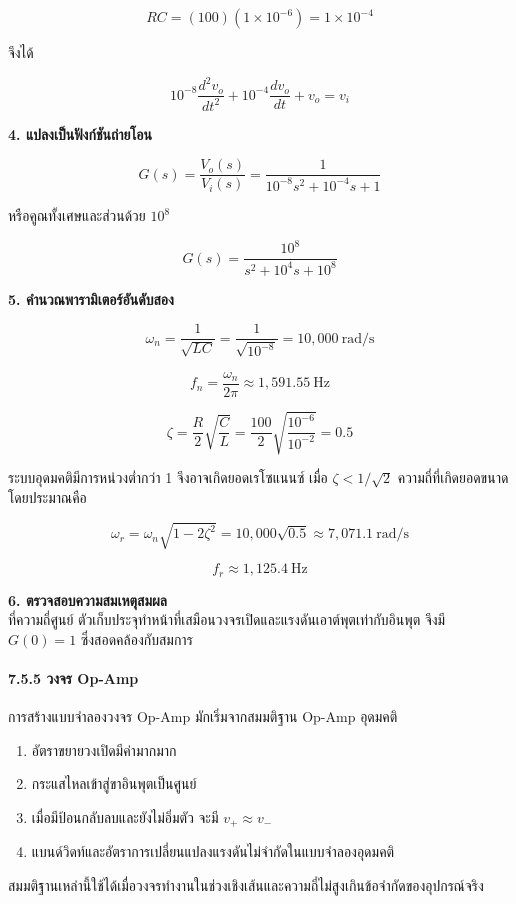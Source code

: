 \[
RC=(100)(1\times10^{-6})=1\times10^{-4}
\]

จึงได้

\[
10^{-8}\frac{d^2v_o}{dt^2}
+10^{-4}\frac{dv_o}{dt}+v_o=v_i
\]

\textbf{4. แปลงเป็นฟังก์ชันถ่ายโอน}

\[
\boxed{
G(s)=\frac{V_o(s)}{V_i(s)}
=\frac{1}{10^{-8}s^2+10^{-4}s+1}
}
\]

หรือคูณทั้งเศษและส่วนด้วย $10^8$

\[
\boxed{
G(s)=\frac{10^8}{s^2+10^4s+10^8}
}
\]

\textbf{5. คำนวณพารามิเตอร์อันดับสอง}

\[
\omega_n=\frac{1}{\sqrt{LC}}
=\frac{1}{\sqrt{10^{-8}}}
=10{,}000\ \text{rad/s}
\]

\[
f_n=\frac{\omega_n}{2\pi}
\approx1{,}591.55\ \text{Hz}
\]

\[
\zeta=\frac{R}{2}\sqrt{\frac{C}{L}}
=\frac{100}{2}\sqrt{\frac{10^{-6}}{10^{-2}}}
=0.5
\]

ระบบอุดมคติมีการหน่วงต่ำกว่า 1 จึงอาจเกิดยอดเรโซแนนซ์ เมื่อ $\zeta<1/\sqrt{2}$ ความถี่ที่เกิดยอดขนาดโดยประมาณคือ

\[
\omega_r=\omega_n\sqrt{1-2\zeta^2}
=10{,}000\sqrt{0.5}
\approx7{,}071.1\ \text{rad/s}
\]

\[
f_r\approx1{,}125.4\ \text{Hz}
\]

\textbf{6. ตรวจสอบความสมเหตุสมผล}\\ที่ความถี่ศูนย์ ตัวเก็บประจุทำหน้าที่เสมือนวงจรเปิดและแรงดันเอาต์พุตเท่ากับอินพุต จึงมี $G(0)=1$ ซึ่งสอดคล้องกับสมการ

\paragraph{7.5.5 วงจร Op-Amp}

การสร้างแบบจำลองวงจร Op-Amp มักเริ่มจากสมมติฐาน Op-Amp อุดมคติ

\begin{enumerate}
    \item อัตราขยายวงเปิดมีค่ามากมาก
    \item กระแสไหลเข้าสู่ขาอินพุตเป็นศูนย์
    \item เมื่อมีป้อนกลับลบและยังไม่อิ่มตัว จะมี $v_+\approx v_-$
    \item แบนด์วิดท์และอัตราการเปลี่ยนแปลงแรงดันไม่จำกัดในแบบจำลองอุดมคติ
\end{enumerate}

สมมติฐานเหล่านี้ใช้ได้เมื่อวงจรทำงานในช่วงเชิงเส้นและความถี่ไม่สูงเกินข้อจำกัดของอุปกรณ์จริง

